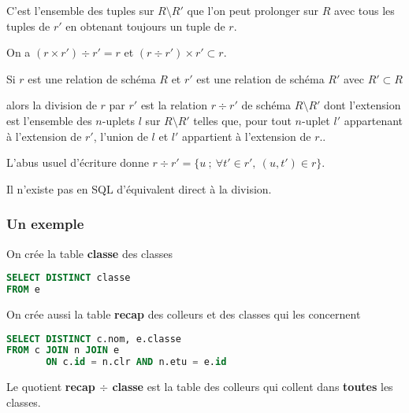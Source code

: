 C'est l'ensemble des tuples sur $R\setminus R'$ que l'on peut prolonger sur $R$ avec tous les tuples de $r'$ en obtenant toujours un tuple de $r$.

On a $(r \times r')\div r'=r$ et $(r \div r')\times r' \subset r$.
\begin{defin}

Si $r$ est une relation de schéma $R$ et $r'$ est une relation de schéma $R'$ avec $R'\subset R$ 

alors la division de $r$ par $r'$ est la relation $r \div r'$ de schéma $R\setminus R'$ dont l'extension est l'ensemble des $n$-uplets $l$ sur $R\setminus R'$ telles que, pour tout $n$-uplet $l'$ appartenant à l'extension de $r'$, l'union de $l$ et $l'$ appartient à l'extension de $r$..

L'abus usuel d'écriture donne
$r\div r'=\bigl\{u\ ;\ \forall t'\in r',\ (u,t')\in r\bigr\}$.
\end{defin}
Il n'existe pas en SQL d'équivalent direct à la division.
\subsubsection{Un exemple}
On crée la table {\bf classe} des classes
\begin{lstlisting}[language=SQL]
SELECT DISTINCT classe
FROM e
\end{lstlisting}
On crée aussi la table {\bf recap} des colleurs et des classes qui les concernent
\begin{lstlisting}[language=SQL]
SELECT DISTINCT c.nom, e.classe
FROM c JOIN n JOIN e 
       ON c.id = n.clr AND n.etu = e.id
\end{lstlisting}
Le quotient {\bf recap $\div$ classe} est la table des colleurs qui collent dans {\bf toutes} les classes.

